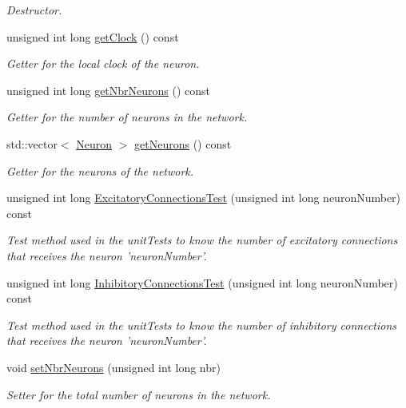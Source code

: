 \begin{DoxyCompactItemize}
\begin{DoxyCompactList}\small\item\em Destructor. \end{DoxyCompactList}\item 
unsigned int long \hyperlink{classNetwork_a45539b55ae8f8addbceca14fa3dfd2a0}{get\-Clock} () const 
\begin{DoxyCompactList}\small\item\em Getter for the local clock of the neuron. \end{DoxyCompactList}\item 
unsigned int long \hyperlink{classNetwork_a7bdc5536e8e0d4885bc0eb97e00bd0ba}{get\-Nbr\-Neurons} () const 
\begin{DoxyCompactList}\small\item\em Getter for the number of neurons in the network. \end{DoxyCompactList}\item 
std\-::vector$<$ \hyperlink{classNeuron}{Neuron} $>$ \hyperlink{classNetwork_a3bd2015d054cef2768ac9d366bac86ab}{get\-Neurons} () const 
\begin{DoxyCompactList}\small\item\em Getter for the neurons of the network. \end{DoxyCompactList}\item 
unsigned int long \hyperlink{classNetwork_a160ad86055cce98540fb485879a209c4}{Excitatory\-Connections\-Test} (unsigned int long neuron\-Number) const 
\begin{DoxyCompactList}\small\item\em Test method used in the unit\-Tests to know the number of excitatory connections that receives the neuron 'neuron\-Number'. \end{DoxyCompactList}\item 
unsigned int long \hyperlink{classNetwork_af7d524e6438ecdf4a1e3bf30d2333b64}{Inhibitory\-Connections\-Test} (unsigned int long neuron\-Number) const 
\begin{DoxyCompactList}\small\item\em Test method used in the unit\-Tests to know the number of inhibitory connections that receives the neuron 'neuron\-Number'. \end{DoxyCompactList}\item 
void \hyperlink{classNetwork_a5b4bf3884d79c4b16c08e51c842c4b4c}{set\-Nbr\-Neurons} (unsigned int long nbr)
\begin{DoxyCompactList}\small\item\em Setter for the total number of neurons in the network. \end{DoxyCompactList}\item 

\end{DoxyCompactItemize}
